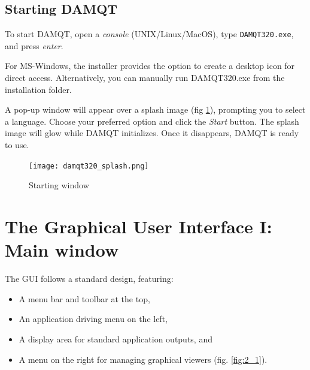 \documentclass[10pt]{article}
\begin{document}
\subsection{Starting DAMQT \label{sec:1.3}}


\begin{minipage}{.65\linewidth}

To start DAMQT, open a {\it console} (UNIX/Linux/MacOS), type \texttt{DAMQT320.exe}, and press {\it enter}.

For MS-Windows, the installer provides the option to create a desktop icon for direct access.
Alternatively, you can manually run DAMQT320.exe from the installation folder.

A pop-up window will appear over a splash image (fig \ref{fig:1_3_1}),
prompting you to select a language. Choose your preferred option and click the {\it Start} button.
The splash image will glow while DAMQT initializes. Once it disappears, DAMQT is ready to use.

\end{minipage}
\begin{minipage}{.38\linewidth}
\vspace*{-8mm}
\begin{figure}[H]
\begin{center}
\texttt{[image: damqt320\_splash.png]}
\end{center}
\caption{{Starting window}\label{fig:1_3_1}}
\end{figure}
\end{minipage}

\newpage

\section{The Graphical User Interface I: Main window \label{sec:2}}

The GUI follows a standard design, featuring:

\begin{itemize}
\item A menu bar and toolbar at the top,
\item An application driving menu on the left,
\item A display area for standard application outputs, and
\item A menu on the right for managing graphical viewers (fig. \ref{fig:2_1}).
\end{itemize}
\end{document}
